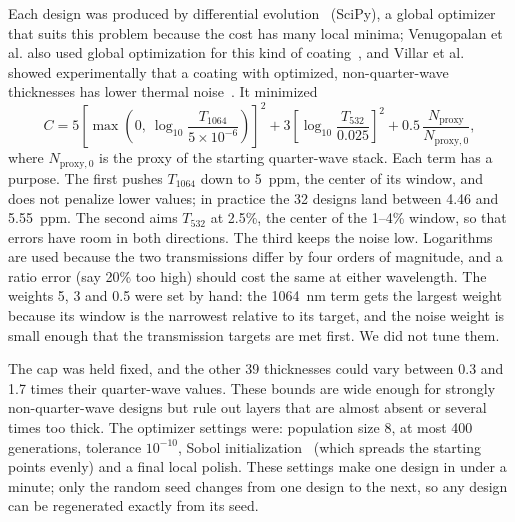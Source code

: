 Each design was produced by differential evolution~\cite{Storn1997} (SciPy), a global optimizer that suits this problem because the cost has many local minima; Venugopalan et al. also used global optimization for this kind of coating~\cite{Venugopalan2024}, and Villar et al. showed experimentally that a coating with optimized, non-quarter-wave thicknesses has lower thermal noise~\cite{Villar2010}. It minimized
\begin{equation}
C = 5\left[\max\!\left(0,\ \log_{10}\frac{T_{1064}}{5\times10^{-6}}\right)\right]^2
  + 3\left[\log_{10}\frac{T_{532}}{0.025}\right]^2
  + 0.5\,\frac{N_{\mathrm{proxy}}}{N_{\mathrm{proxy},0}} ,
\label{eq:designcost}
\end{equation}
where $N_{\mathrm{proxy},0}$ is the proxy of the starting quarter-wave stack. Each term has a purpose. The first pushes $T_{1064}$ down to 5~ppm, the center of its window, and does not penalize lower values; in practice the 32 designs land between 4.46 and 5.55~ppm. The second aims $T_{532}$ at 2.5\%, the center of the 1--4\% window, so that errors have room in both directions. The third keeps the noise low. Logarithms are used because the two transmissions differ by four orders of magnitude, and a ratio error (say 20\% too high) should cost the same at either wavelength. The weights 5, 3 and 0.5 were set by hand: the 1064~nm term gets the largest weight because its window is the narrowest relative to its target, and the noise weight is small enough that the transmission targets are met first. We did not tune them.

The cap was held fixed, and the other 39 thicknesses could vary between 0.3 and 1.7 times their quarter-wave values. These bounds are wide enough for strongly non-quarter-wave designs but rule out layers that are almost absent or several times too thick. The optimizer settings were: population size 8, at most 400 generations, tolerance $10^{-10}$, Sobol initialization~\cite{Sobol1967} (which spreads the starting points evenly) and a final local polish. These settings make one design in under a minute; only the random seed changes from one design to the next, so any design can be regenerated exactly from its seed.

